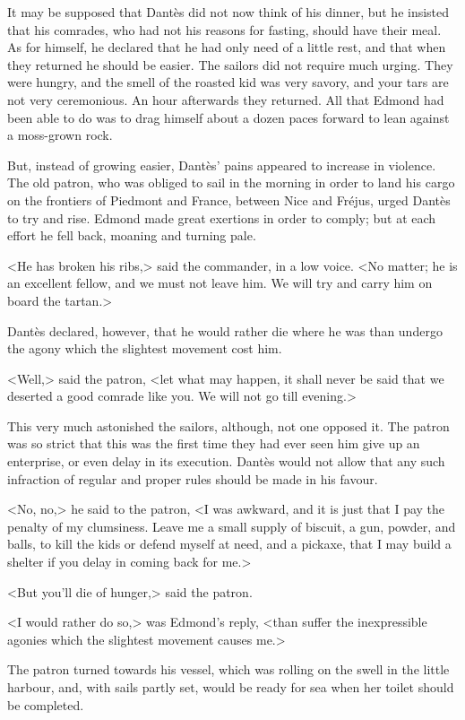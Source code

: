  It may be supposed that Dantès did not now think of his dinner, but he insisted that his comrades, who had not his reasons for fasting, should have their meal. As for himself, he declared that he had only need of a little rest, and that when they returned he should be easier. The sailors did not require much urging. They were hungry, and the smell of the roasted kid was very savory, and your tars are not very ceremonious. An hour afterwards they returned. All that Edmond had been able to do was to drag himself about a dozen paces forward to lean against a moss-grown rock. 

 But, instead of growing easier, Dantès' pains appeared to increase in violence. The old patron, who was obliged to sail in the morning in order to land his cargo on the frontiers of Piedmont and France, between Nice and Fréjus, urged Dantès to try and rise. Edmond made great exertions in order to comply; but at each effort he fell back, moaning and turning pale. 

 <He has broken his ribs,> said the commander, in a low voice. <No matter; he is an excellent fellow, and we must not leave him. We will try and carry him on board the tartan.> 

 Dantès declared, however, that he would rather die where he was than undergo the agony which the slightest movement cost him. 

 <Well,> said the patron, <let what may happen, it shall never be said that we deserted a good comrade like you. We will not go till evening.> 

 This very much astonished the sailors, although, not one opposed it. The patron was so strict that this was the first time they had ever seen him give up an enterprise, or even delay in its execution. Dantès would not allow that any such infraction of regular and proper rules should be made in his favour. 

 <No, no,> he said to the patron, <I was awkward, and it is just that I pay the penalty of my clumsiness. Leave me a small supply of biscuit, a gun, powder, and balls, to kill the kids or defend myself at need, and a pickaxe, that I may build a shelter if you delay in coming back for me.> 

 <But you'll die of hunger,> said the patron. 

 <I would rather do so,> was Edmond's reply, <than suffer the inexpressible agonies which the slightest movement causes me.> 

 The patron turned towards his vessel, which was rolling on the swell in the little harbour, and, with sails partly set, would be ready for sea when her toilet should be completed. 

